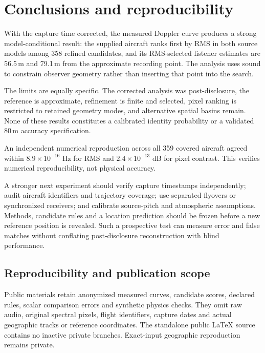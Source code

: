 \documentclass[11pt]{article}
\newcommand{\nextsection}[1]{\clearpage\section{#1}}
\begin{document}
\nextsection{Conclusions and reproducibility}
With the capture time corrected, the measured Doppler curve produces a strong model-conditional result: the supplied aircraft ranks first by RMS in both source models among 358 refined candidates, and its RMS-selected listener estimates are 56.5\,m and 79.1\,m from the approximate recording point. The analysis uses sound to constrain observer geometry rather than inserting that point into the search. 

The limits are equally specific. The corrected analysis was post-disclosure, the reference is approximate, refinement is finite and selected, pixel ranking is restricted to retained geometry modes, and alternative spatial basins remain. None of these results constitutes a calibrated identity probability or a validated 80\,m accuracy specification. 

An independent numerical reproduction across all 359 covered aircraft agreed within $8.9\times10^{-16}$ Hz for RMS and $2.4\times10^{-13}$ dB for pixel contrast. This verifies numerical reproducibility, not physical accuracy.

A stronger next experiment should verify capture timestamps independently; audit aircraft identifiers and trajectory coverage; use separated flyovers or synchronized receivers; and calibrate source-pitch and atmospheric assumptions. Methods, candidate rules and a location prediction should be frozen before a new reference position is revealed. Such a prospective test can measure error and false matches without conflating post-disclosure reconstruction with blind performance.

\subsection*{Reproducibility and publication scope}

Public materials retain anonymized measured curves, candidate scores, declared rules, scalar comparison errors and synthetic physics checks. They omit raw audio, original spectral pixels, flight identifiers, capture dates and actual geographic tracks or reference coordinates. The standalone public \LaTeX{} source contains no inactive private branches. Exact-input geographic reproduction remains private.
\end{document}
